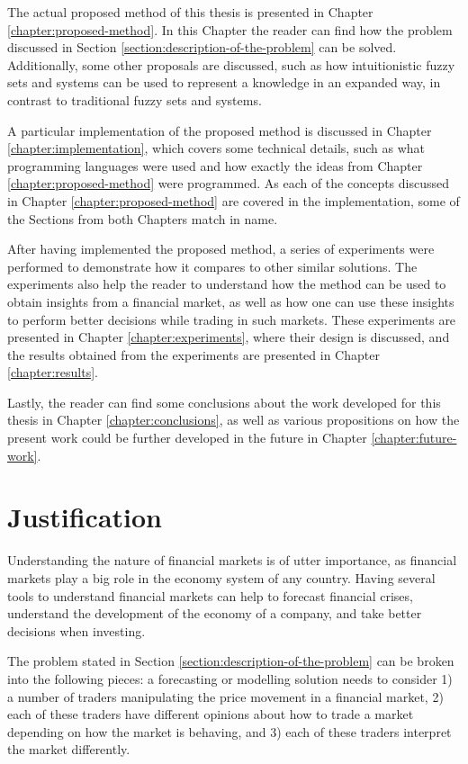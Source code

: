 The actual proposed method of this thesis is presented in Chapter
\ref{chapter:proposed-method}. In this Chapter the reader can find how the
problem discussed in Section \ref{section:description-of-the-problem} can be
solved. Additionally, some other proposals are discussed, such as how
intuitionistic fuzzy sets and systems can be used to represent a knowledge in an
expanded way, in contrast to traditional fuzzy sets and systems.

A particular implementation of the proposed method is discussed in Chapter
\ref{chapter:implementation}, which covers some technical details, such as what
programming languages were used and how exactly the ideas from Chapter
\ref{chapter:proposed-method} were programmed. As each of the concepts discussed
in Chapter \ref{chapter:proposed-method} are covered in the implementation, some
of the Sections from both Chapters match in name.

After having implemented the proposed method, a series of experiments were
performed to demonstrate how it compares to other similar solutions. The
experiments also help the reader to understand how the method can be used to
obtain insights from a financial market, as well as how one can use these
insights to perform better decisions while trading in such markets. These %
experiments are presented in Chapter \ref{chapter:experiments}, where their
design is discussed, and the results obtained from the experiments are presented
in Chapter \ref{chapter:results}.

Lastly, the reader can find some conclusions about the work developed for this
thesis in Chapter \ref{chapter:conclusions}, as well as various propositions on
how the present work could be further developed in the future in Chapter
\ref{chapter:future-work}.

\section{Justification}
\label{section:justification}

Understanding the nature of financial markets is of utter importance, as
financial markets play a big role in the economy system of any country. Having
several tools to understand financial markets can help to forecast financial
crises, understand the development of the economy of a company, and take better
decisions when investing.

The problem stated in Section \ref{section:description-of-the-problem} can be
broken into the following pieces: a forecasting or modelling solution needs to
consider 1) a number of traders manipulating the price movement in a financial
market, 2) each of these traders have different opinions about how to trade a
market depending on how the market is behaving, and 3) each of these traders
interpret the market differently.

